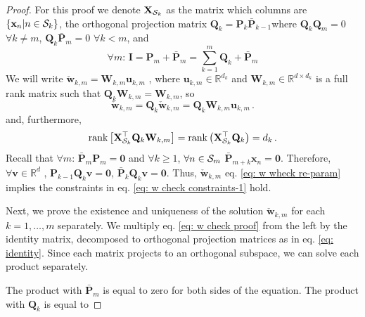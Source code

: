 \documentclass[twoside,11pt,english]{article}
\begin{document}
{\begin{proof}
For this proof we denote $\mathbf{X}_{\mathcal{S}_{k}}$ as the matrix which
columns are $\left\{ \mathbf{x}_{n}|n\in\mathcal{S}_{k}\right\} $, the orthogonal
projection matrix $\mathbf{Q}_{k}=\mathbf{P}_{k}\bar{\mathbf{P}}_{k-1}$where
$\mathbf{Q}_{k}\mathbf{Q}_{m}=0$ $\forall k\neq m$, $\mathbf{Q}_{k}\bar{\mathbf{P}}_{m}=0$
$\forall k<m$, and
\begin{equation}
\forall m:\,\mathbf{I}=\mathbf{P}_{m}+\bar{\mathbf{P}}_{m}=\sum_{k=1}^{m}\mathbf{Q}_{k}+\bar{\mathbf{P}}_{m}\label{eq: identity}
\end{equation}
We will write $\check{\mathbf{w}}_{k,m}=\mathbf{W}_{k,m}\mathbf{u}_{k,m}$
, where $\mathbf{u}_{k,m}\in\mathbb{R}^{d_{k}}$ and $\mathbf{W}_{k,m}\in\mathbb{R}^{d\times d_{k}}$
is a full rank matrix such that $\mathbf{Q}_{k}\mathbf{W}_{k,m}=\mathbf{W}_{k,m}$,
so 
\begin{equation}
\check{\mathbf{w}}_{k,m}=\mathbf{Q}_{k}\check{\mathbf{w}}_{k,m}=\mathbf{Q}_{k}\mathbf{W}_{k,m}\mathbf{u}_{k,m}\,.\label{eq: w wheck re-param}
\end{equation}
 and, furthermore,
\begin{equation}
\mathrm{rank}\left[\mathbf{X}_{\mathcal{S}_{k}}^{\top}\mathbf{Q}_{k}\mathbf{W}_{k,m}\right]=\mathrm{rank}\left(\mathbf{X}_{\mathcal{S}_{k}}^{\top}\mathbf{Q}_{k}\right)=d_{k}\,.\label{eq: rank W}
\end{equation}
Recall that $\forall m:\,\mathbf{\bar{P}}_{m}\mathbf{P}_{m}=\boldsymbol{0}$
and $\forall k\geq1$, $\forall n\in\mathcal{S}_{m}$ $\mathbf{\bar{P}}_{m+k}\mathbf{x}_{n}=\boldsymbol{0}$.
Therefore, $\forall\mathbf{v}\in\mathbb{R}^{d}$ , $\mathbf{P}_{k-1}\mathbf{Q}_{k}\mathbf{v}=\boldsymbol{0}$,
$\mathbf{\bar{P}}_{k}\mathbf{Q}_{k}\mathbf{v}=\mathbf{0}$. Thus,
$\check{\mathbf{w}}_{k,m}$ eq. \ref{eq: w wheck re-param} implies
the constraints in eq. \ref{eq: w check constraints-1} hold. 

Next, we prove the existence and uniqueness of the solution $\check{\mathbf{w}}_{k,m}$
for each $k=1,\dots,m$ separately. We multiply eq. \ref{eq: w check proof}
from the left by the identity matrix, decomposed to orthogonal projection
matrices as in eq. \ref{eq: identity}. Since each matrix projects
to an orthogonal subspace, we can solve each product separately. 

The product with $\bar{\mathbf{P}}_{m}$ is equal to zero for both
sides of the equation. The product with $\mathbf{Q}_{k}$ is equal
to


\end{proof}}
\end{document}
